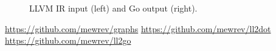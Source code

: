 \documentclass[a2paper,landscape,fontscale=0.35]{baposter}
\begin{document}
\begin{poster}
{	\begin{figure}[H]
		\centering
		\begin{subfigure}[ht]{0.58\textwidth}
			
		\end{subfigure}
		\enskip
		\begin{subfigure}[ht]{0.38\textwidth}
			
		\end{subfigure}
		\caption{LLVM IR input (left) and Go output (right).}
	\end{figure}
}

{
	\url{https://github.com/mewrev/graphs}
	\url{https://github.com/mewrev/ll2dot}
	\url{https://github.com/mewrev/ll2go}
}

{
	\renewcommand{\section}[2]{}
	
}

\end{poster}
\end{document}
